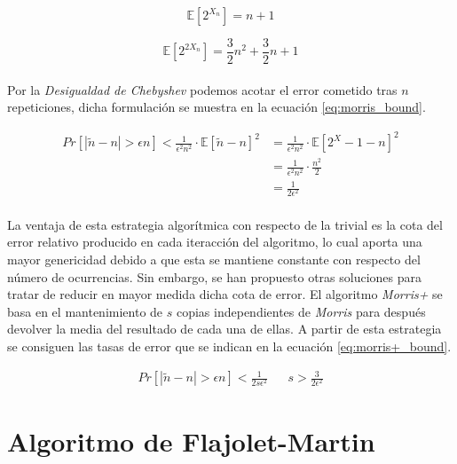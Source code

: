 \documentclass{subfiles}
\begin{document}
      \begin{equation}
      \label{eq:morris_expectation_1}
        \mathbb{E}[2^{X_n}] = n + 1
      \end{equation}

      \begin{equation}
      \label{eq:morris_expectation_2}
        \mathbb{E}[2^{2X_n}] = \frac{3}{2}n^2 + \frac{3}{2}n + 1
      \end{equation}

      \paragraph{}
      Por la \emph{Desigualdad de Chebyshev} podemos acotar el error cometido tras $n$ repeticiones, dicha formulación se muestra en la ecuación \eqref{eq:morris_bound}.

      \begin{align}
      \label{eq:morris_bound}
        Pr[|\widetilde{n} - n| > \epsilon n ] < \frac{1}{\epsilon^2n^2}\cdot\mathbb{E}[\widetilde{n} - n]^2
          &= \frac{1}{\epsilon^2n^2}\cdot\mathbb{E}[2^X-1-n]^2
        \\&= \frac{1}{\epsilon^2n^2}\cdot \frac{n^2}{2}
        \\&= \frac{1}{2\epsilon^2}
      \end{align}

      \paragraph{}
      La ventaja de esta estrategia algorítmica con respecto de la trivial es la cota del error relativo producido en cada iteracción del algoritmo, lo cual aporta una mayor genericidad debido a que esta se mantiene constante con respecto del número de ocurrencias. Sin embargo, se han propuesto otras soluciones para tratar de reducir en mayor medida dicha cota de error. El algoritmo \emph{Morris+} se basa en el mantenimiento de $s$ copias independientes de \emph{Morris} para después devolver la media del resultado de cada una de ellas. A partir de esta estrategia se consiguen las tasas de error que se indican en la ecuación \eqref{eq:morris+_bound}.

      \begin{align}
      \label{eq:morris+_bound}
        Pr[|\widetilde{n} - n| > \epsilon n ] < \frac{1}{2s\epsilon^2} && s > \frac{3}{2\epsilon^2}
      \end{align}


    \section{Algoritmo de Flajolet-Martin}
    \label{sec:streaming_flajolet_martin_algorithm}
\end{document}
